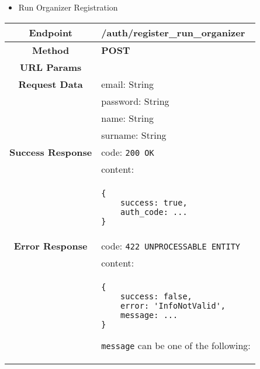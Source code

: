 \begin{itemize}
        \item Run Organizer Registration
    \end{itemize}
    \begin{adjustwidth}{1cm}{}
        \begin{longtable}{|c|l|}
            \hline
            \textbf{Endpoint} & /auth/register\_run\_organizer \\
            \hline
            \textbf{Method} & \textbf{POST} \\
            \hline
            \textbf{URL Params} &  \\
            \hline
            \textbf{Request Data} & email: String \\
            &                 password: String \\
            &                 name: String \\
            &                 surname: String \\
            \hline
            \textbf{Success Response} & code: \texttt{200 OK} \\
            &                           content: \\
            & \begin{minipage}[t]{0.5\textwidth}
                \begin{adjustwidth}{1.5cm}{}
                \begin{verbatim}
{
    success: true, 
    auth_code: ...
}
                \end{verbatim}
                \end{adjustwidth}
              \end{minipage} \\
              \hline
            \textbf{Error Response} & code: \texttt{422 UNPROCESSABLE ENTITY} \\
            &                         content: \\
            & \begin{minipage}[t]{0.7\textwidth}
                \begin{adjustwidth}{1.5cm}{}
                \begin{verbatim}
{
    success: false, 
    error: 'InfoNotValid',
    message: ...
}
                \end{verbatim}
                \end{adjustwidth}
                \texttt{message} can be one of the following: 
                \begin{itemize}

\end{itemize}
\end{minipage}
\end{longtable}
\end{adjustwidth}
